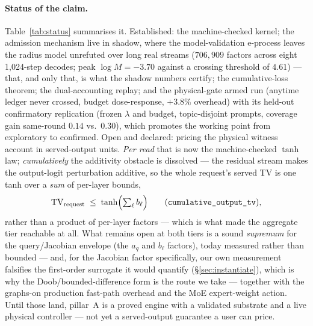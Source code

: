 \documentclass[11pt]{article}
\renewcommand{\_}{\WCorigunderscore\allowbreak}
\begin{document}
\paragraph{Status of the claim.} Table~\ref{tab:status} summarises it.
Established: the machine-checked kernel; the admission mechanism live
in shadow, where the model-validation e-process leaves the radius model
unrefuted over long real streams ($706{,}909$ factors across eight
1{,}024-step decodes; peak $\log M=-3.70$ against a crossing threshold
of $4.61$) --- that, and only that, is what the shadow numbers certify;
the cumulative-loss theorem; the dual-accounting replay; and the
physical-gate armed run (anytime ledger never crossed, budget
dose-response, $+3.8\%$ overhead) with its held-out confirmatory
replication (frozen $\lambda$ and budget, topic-disjoint prompts,
coverage gain same-round $0.14$ vs.\ $0.30$), which promotes the
working point from exploratory to confirmed. Open and declared: pricing
the physical witness account in served-output units. \emph{Per read}
that is now the machine-checked $\tanh$ law; \emph{cumulatively} the
additivity obstacle is dissolved --- the residual stream makes the
output-logit perturbation additive, so the whole request's served TV is
one tanh over a \emph{sum} of per-layer bounds,
\begin{equation}
\mathrm{TV}_{\text{request}}\;\le\;
\tanh\Bigl(\textstyle\sum_\ell b_\ell\Bigr)
\qquad(\texttt{cumulative\_output\_tv}),
\label{eq:cumtv}
\end{equation}
rather than a product of per-layer factors --- which is what made the
aggregate tier reachable at all. What remains open at both tiers is a sound
\emph{supremum} for the query/Jacobian envelope (the $a_q$ and $b_\ell$
factors), today measured rather than bounded --- and, for the Jacobian
factor specifically, our own measurement falsifies the first-order
surrogate it would quantify (\S\ref{sec:instantiate}), which is why the
Doob/bounded-difference form is the route we take --- together with the
graphs-on production fast-path overhead and the MoE expert-weight
action. Until those land, pillar~A is a proved engine with
a validated substrate and a live physical controller --- not yet a
served-output guarantee a user can price.
\end{document}

